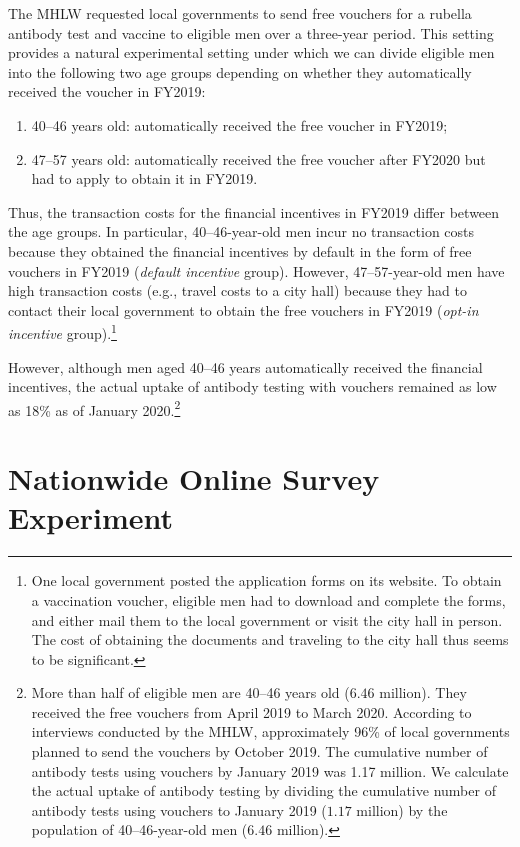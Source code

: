 \documentclass[
  11pt,
  a4paper
]{article}
\providecommand{\tightlist}{%
  \setlength{\itemsep}{0pt}\setlength{\parskip}{0pt}}
\begin{document}
The MHLW requested local governments to send free vouchers for a rubella antibody test and vaccine to eligible men over a three-year period. This setting provides a natural experimental setting under which we can divide eligible men into the following two age groups depending on whether they automatically received the voucher in FY2019:

\begin{enumerate}
\def\labelenumi{\arabic{enumi}.}
\tightlist
\item
  40--46 years old: automatically received the free voucher in FY2019;
\item
  47--57 years old: automatically received the free voucher after FY2020 but had to apply to obtain it in FY2019.
\end{enumerate}

Thus, the transaction costs for the financial incentives in FY2019 differ between the age groups. In particular, 40--46-year-old men incur no transaction costs because they obtained the financial incentives by default in the form of free vouchers in FY2019 (\emph{default incentive} group). However, 47--57-year-old men have high transaction costs (e.g., travel costs to a city hall) because they had to contact their local government to obtain the free vouchers in FY2019 (\emph{opt-in incentive} group).\footnote{One local government posted the application forms on its website. To obtain a vaccination voucher, eligible men had to download and complete the forms, and either mail them to the local government or visit the city hall in person. The cost of obtaining the documents and traveling to the city hall thus seems to be significant.}

However, although men aged 40--46 years automatically received the financial incentives, the actual uptake of antibody testing with vouchers remained as low as 18\% as of January 2020.\footnote{More than half of eligible men are 40--46 years old (\(6.46\) million). They received the free vouchers from April 2019 to March 2020. According to interviews conducted by the MHLW, approximately 96\% of local governments planned to send the vouchers by October 2019. The cumulative number of antibody tests using vouchers by January 2019 was 1.17 million. We calculate the actual uptake of antibody testing by dividing the cumulative number of antibody tests using vouchers to January 2019 (\(1.17\) million) by the population of 40--46-year-old men (\(6.46\) million).}

\hypertarget{experiment}{%
\section{Nationwide Online Survey Experiment}\label{experiment}}
\end{document}
